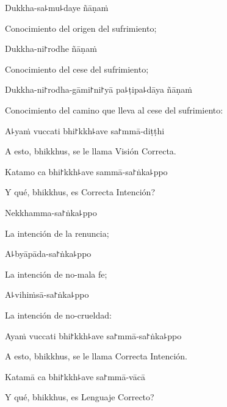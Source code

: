 Dukkha-sa꜕mu꜕daye ñāṇaṁ

\begin{english}
	Conocimiento del origen del sufrimiento;
\end{english}

Dukkha-ni꜓rodhe ñāṇaṁ

\begin{english}
	Conocimiento del cese del sufrimiento;
\end{english}

Dukkha-ni꜓rodha-gāmi꜓ni꜓yā pa꜕ṭipa꜕dāya ñāṇaṁ

\begin{english}
	Conocimiento del camino que lleva al cese del sufrimiento:
\end{english}

A꜕yaṁ vuccati bhi꜓kkh꜕ave sa꜓mmā-diṭṭhi

\begin{english}
	A esto, bhikkhus, se le llama Visión Correcta.
\end{english}

Katamo ca bhi꜓kkh꜕ave sammā-sa꜓ṅka꜕ppo

\begin{english}
	Y qué, bhikkhus, es Correcta Intención?
\end{english}

\ifaivedition
\clearpage
\fi

Nekkhamma-sa꜓ṅka꜕ppo

\begin{english}
	La intención de la renuncia;
\end{english}

A꜕byāpāda-sa꜓ṅka꜕ppo

\begin{english}
	La intención de no-mala fe;
\end{english}

A꜕vihiṁsā-sa꜓ṅka꜕ppo

\begin{english}
	La intención de no-crueldad:
\end{english}

Ayaṁ vuccati bhi꜓kkh꜕ave sa꜓mmā-sa꜓ṅka꜕ppo

\begin{english}
	A esto, bhikkhus, se le llama Correcta Intención.
\end{english}

Katamā ca bhi꜓kkh꜕ave sa꜓mmā-vācā

\begin{english}
	Y qué, bhikkhus, es Lenguaje Correcto?
\end{english}

